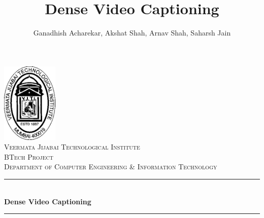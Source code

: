 \documentclass[]{book}
\title{Dense Video Captioning}
\author{Ganadhish Acharekar, Akshat Shah, Arnav Shah, Saharsh Jain}
\begin{document}

\begin{titlepage} %
	\newcommand{\HRule}{\rule{\linewidth}{0.5mm}} %
	
	\center %
	

	\includegraphics[width=0.2\textwidth]{assets/img/vjti.png}\\[1cm] %

	\textsc{\LARGE Veermata Jijabai Technological Institute}\\[1.5cm] %
	
	\textsc{\Large BTech Project}\\[0.5cm] %
	
	\textsc{\large Department of Computer Engineering \& Information Technology}\\[0.5cm] %
	
	
	\HRule\\[0.4cm]
	
	{\huge\bfseries Dense Video Captioning}\\[0.4cm] %
	
	\HRule\\[1.5cm]
	
	

\end{titlepage}
\end{document}
